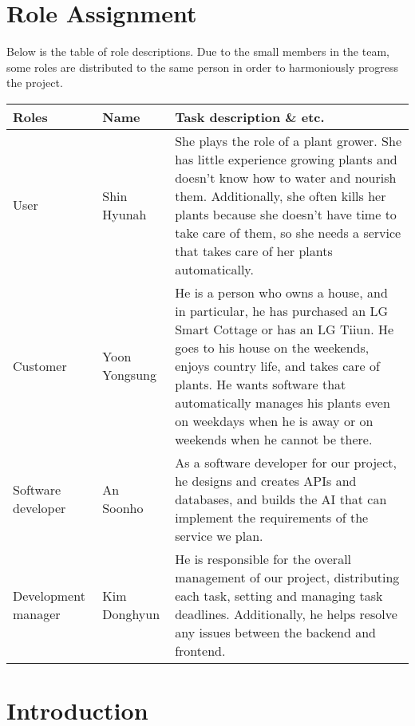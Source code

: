 \documentclass[conference, a4paper]{IEEEtran}
\begin{document}
\section{Role Assignment}
Below is the table of role descriptions. Due to the small
members in the team, some roles are distributed to the same
person in order to harmoniously progress the project.
\begin{table}[h]
\setlength{\tabcolsep}{12pt}
\renewcommand{\arraystretch}{1.5}
\begin{tabular}{p{1.3cm} l p{3.2cm}} \hline
Roles & Name & Task description \& etc.\\ \hline
User & Shin Hyunah & 
She plays the role of a plant grower.
She has little experience growing plants and doesn't know how to water and nourish them.
Additionally, she often kills her plants because she doesn't have time to take care of them,
so she needs a service that takes care of her plants automatically.\\

Customer & Yoon Yongsung & He is a person who owns a house, and in particular, he has purchased an LG Smart Cottage or has an LG Tiiun. He goes to his house on the weekends, enjoys country life, and takes care of plants. He wants software that automatically manages his plants even on weekdays when he is away or on weekends when he cannot be there.\\
Software developer & An Soonho & As a software developer for our project, he designs and creates APIs and databases, and builds the AI that can implement the requirements of the service we plan.\\
Development manager & Kim Donghyun & He is responsible for the overall management of our project, distributing each task, setting and managing task deadlines. Additionally, he helps resolve any issues between the backend and frontend. \\ 
\hline
\end{tabular}
\end{table}
\newpage

\section{Introduction}
\end{document}

